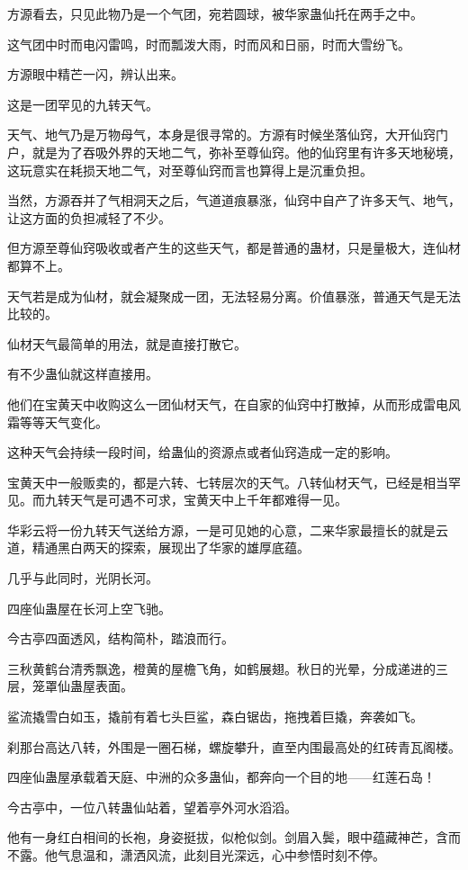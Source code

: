 \begin{this_body}
方源看去，只见此物乃是一个气团，宛若圆球，被华家蛊仙托在两手之中。

这气团中时而电闪雷鸣，时而瓢泼大雨，时而风和日丽，时而大雪纷飞。

方源眼中精芒一闪，辨认出来。

这是一团罕见的九转天气。

天气、地气乃是万物母气，本身是很寻常的。方源有时候坐落仙窍，大开仙窍门户，就是为了吞吸外界的天地二气，弥补至尊仙窍。他的仙窍里有许多天地秘境，这玩意实在耗损天地二气，对至尊仙窍而言也算得上是沉重负担。

当然，方源吞并了气相洞天之后，气道道痕暴涨，仙窍中自产了许多天气、地气，让这方面的负担减轻了不少。

但方源至尊仙窍吸收或者产生的这些天气，都是普通的蛊材，只是量极大，连仙材都算不上。

天气若是成为仙材，就会凝聚成一团，无法轻易分离。价值暴涨，普通天气是无法比较的。

仙材天气最简单的用法，就是直接打散它。

有不少蛊仙就这样直接用。

他们在宝黄天中收购这么一团仙材天气，在自家的仙窍中打散掉，从而形成雷电风霜等等天气变化。

这种天气会持续一段时间，给蛊仙的资源点或者仙窍造成一定的影响。

宝黄天中一般贩卖的，都是六转、七转层次的天气。八转仙材天气，已经是相当罕见。而九转天气是可遇不可求，宝黄天中上千年都难得一见。

华彩云将一份九转天气送给方源，一是可见她的心意，二来华家最擅长的就是云道，精通黑白两天的探索，展现出了华家的雄厚底蕴。

几乎与此同时，光阴长河。

四座仙蛊屋在长河上空飞驰。

今古亭四面透风，结构简朴，踏浪而行。

三秋黄鹤台清秀飘逸，橙黄的屋檐飞角，如鹤展翅。秋日的光晕，分成递进的三层，笼罩仙蛊屋表面。

鲨流撬雪白如玉，撬前有着七头巨鲨，森白锯齿，拖拽着巨撬，奔袭如飞。

刹那台高达八转，外围是一圈石梯，螺旋攀升，直至内围最高处的红砖青瓦阁楼。

四座仙蛊屋承载着天庭、中洲的众多蛊仙，都奔向一个目的地——红莲石岛！

今古亭中，一位八转蛊仙站着，望着亭外河水滔滔。

他有一身红白相间的长袍，身姿挺拔，似枪似剑。剑眉入鬓，眼中蕴藏神芒，含而不露。他气息温和，潇洒风流，此刻目光深远，心中参悟时刻不停。


\end{this_body}
